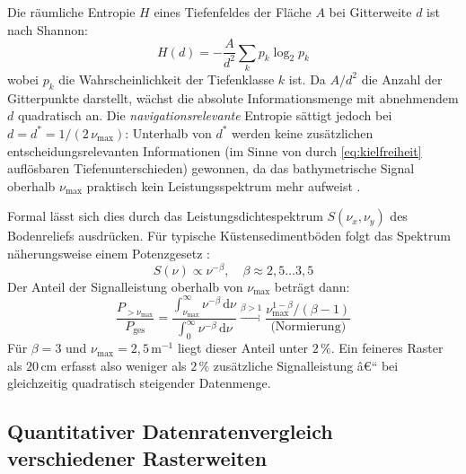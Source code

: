 ﻿\documentclass[a4paper,12pt]{article}
\theoremstyle{definition}
\begin{document}
Die räumliche Entropie $H$ eines Tiefenfeldes der Fläche $A$ bei
Gitterweite $d$ ist nach Shannon:
\begin{equation}
  H(d) = -\frac{A}{d^2}\sum_{k} p_k \log_2 p_k
  \label{eq:entropie}
\end{equation}
wobei $p_k$ die Wahrscheinlichkeit der Tiefenklasse $k$ ist. Da
$A/d^2$ die Anzahl der Gitterpunkte darstellt, wächst die
absolute Informationsmenge mit abnehmendem $d$ quadratisch an.
Die \emph{navigationsrelevante} Entropie sättigt jedoch bei
$d = d^* = 1/(2\,\nu_{\max})$: Unterhalb von $d^*$ werden keine
zusätzlichen entscheidungsrelevanten Informationen (im Sinne von
durch \eqref{eq:kielfreiheit} auflösbaren Tiefenunterschieden)
gewonnen, da das bathymetrische Signal oberhalb $\nu_{\max}$
praktisch kein Leistungsspektrum mehr aufweist \cite{goff1988}.

\medskip\noindent
Formal lässt sich dies durch das Leistungsdichtespektrum
$S(\nu_x, \nu_y)$ des Bodenreliefs ausdrücken. Für typische
Küstensedimentböden folgt das Spektrum näherungsweise einem
Potenzgesetz \cite{goff1988, herzfeld1993}:
\begin{equation}
  S(\nu) \propto \nu^{-\beta}, \quad \beta \approx 2{,}5\ldots 3{,}5
  \label{eq:psd}
\end{equation}
Der Anteil der Signalleistung oberhalb von $\nu_{\max}$ beträgt
dann:
\begin{equation}
  \frac{P_{>\nu_{\max}}}{P_{\text{ges}}}
  = \frac{\int_{\nu_{\max}}^{\infty} \nu^{-\beta}\,\mathrm{d}\nu}
         {\int_{0}^{\infty} \nu^{-\beta}\,\mathrm{d}\nu}
  \xrightarrow{\beta > 1} \frac{\nu_{\max}^{1-\beta}/(\beta-1)}{\text{(Normierung)}}
  \label{eq:spectralpower}
\end{equation}
Für $\beta = 3$ und $\nu_{\max} = 2{,}5\,\text{m}^{-1}$ liegt dieser
Anteil unter $2\,\%$. Ein feineres Raster als $20\,\text{cm}$ erfasst
also weniger als $2\,\%$ zusätzliche Signalleistung â€“ bei gleichzeitig
quadratisch steigender Datenmenge.

\subsection{Quantitativer Datenratenvergleich verschiedener Rasterweiten}
\end{document}
